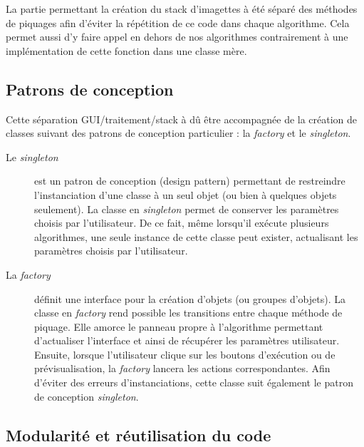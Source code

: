 La partie permettant la création du stack d'imagettes à été séparé des méthodes de piquages afin d'éviter la répétition de ce code dans chaque algorithme. Cela permet aussi d'y faire appel en dehors de nos algorithmes contrairement à une implémentation de cette fonction dans une classe mère.

\subsection{Patrons de conception}

Cette séparation GUI/traitement/stack à dû être accompagnée de la création de classes suivant des patrons de conception particulier : la \emph{factory} et le \emph{singleton}. 
\begin{description}
\item [Le \emph{singleton}] est un patron de conception (design pattern) permettant de restreindre l'instanciation d'une classe à un seul objet (ou bien à quelques objets seulement). La classe en \emph{singleton} permet de conserver les paramètres choisis par l'utilisateur. De ce fait, même lorsqu'il exécute plusieurs algorithmes, une seule instance de cette classe peut exister, actualisant les paramètres choisis par l'utilisateur.
\item[La \emph{factory}] définit une interface pour la création d'objets (ou groupes d'objets). La classe en \emph{factory} rend possible les transitions entre chaque méthode de piquage. Elle amorce le panneau propre à l'algorithme permettant d'actualiser l'interface et ainsi de récupérer les paramètres utilisateur. Ensuite, lorsque l'utilisateur clique sur les boutons d'exécution ou de prévisualisation, la \emph{factory} lancera les actions correspondantes. Afin d'éviter des erreurs d'instanciations, cette classe suit également le patron de conception \emph{singleton}.
\end{description}

\pagebreak
\subsection{Modularité et réutilisation du code}

